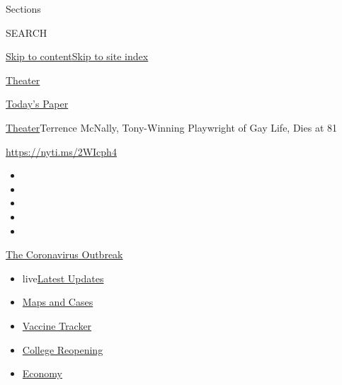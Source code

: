 Sections

SEARCH

\protect\hyperlink{site-content}{Skip to
content}\protect\hyperlink{site-index}{Skip to site index}

\href{https://www.nytimes.com/section/theater}{Theater}

\href{https://myaccount.nytimes.com/auth/login?response_type=cookie\&client_id=vi}{}

\href{https://www.nytimes.com/section/todayspaper}{Today's Paper}

\href{/section/theater}{Theater}\textbar{}Terrence McNally, Tony-Winning
Playwright of Gay Life, Dies at 81

\url{https://nyti.ms/2WIcph4}

\begin{itemize}
\item
\item
\item
\item
\item
\end{itemize}

\href{https://www.nytimes.com/news-event/coronavirus?action=click\&pgtype=Article\&state=default\&region=TOP_BANNER\&context=storylines_menu}{The
Coronavirus Outbreak}

\begin{itemize}
\tightlist
\item
  live\href{https://www.nytimes.com/2020/08/03/world/coronavirus-covid-19.html?action=click\&pgtype=Article\&state=default\&region=TOP_BANNER\&context=storylines_menu}{Latest
  Updates}
\item
  \href{https://www.nytimes.com/interactive/2020/us/coronavirus-us-cases.html?action=click\&pgtype=Article\&state=default\&region=TOP_BANNER\&context=storylines_menu}{Maps
  and Cases}
\item
  \href{https://www.nytimes.com/interactive/2020/science/coronavirus-vaccine-tracker.html?action=click\&pgtype=Article\&state=default\&region=TOP_BANNER\&context=storylines_menu}{Vaccine
  Tracker}
\item
  \href{https://www.nytimes.com/2020/08/02/us/covid-college-reopening.html?action=click\&pgtype=Article\&state=default\&region=TOP_BANNER\&context=storylines_menu}{College
  Reopening}
\item
  \href{https://www.nytimes.com/live/2020/08/03/business/stock-market-today-coronavirus?action=click\&pgtype=Article\&state=default\&region=TOP_BANNER\&context=storylines_menu}{Economy}
\end{itemize}

